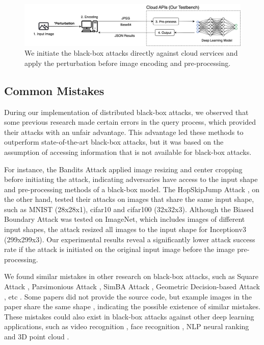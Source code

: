 \begin{figure}[tbp]
    \centering
    \includegraphics[width=\linewidth]{figures/chapter_classification/cloudapi.jpg}
    \caption{We initiate the black-box attacks directly against cloud services and apply the perturbation before image encoding and pre-processing.}
    \label{fig:cloudapi}
\end{figure}

\subsection{Common Mistakes}
\label{common_errors}

During our implementation of distributed black-box attacks, we observed that some previous research made certain errors in the query process, which provided their attacks with an unfair advantage. This advantage led these methods to outperform state-of-the-art black-box attacks, but it was based on the assumption of accessing information that is not available for black-box attacks. 

For instance, the Bandits Attack \cite{ilyas2018black, ilyas2018prior} applied image resizing and center cropping before initiating the attack, indicating adversaries have access to the input shape and pre-processing methods of a black-box model. The HopSkipJump Attack \cite{chen2020hopskipjumpattack}, on the other hand, tested their attacks on images that share the same input shape, such as MNIST (28x28x1), cifar10 and cifar100 (32x32x3). Although the Biased Boundary Attack \cite{Brunner_2019} was tested on ImageNet, which includes images of different input shapes, the attack resized all images to the input shape for Inceptionv3 (299x299x3). Our experimental results reveal a significantly lower attack success rate if the attack is initiated on the original input image before the image pre-processing.

We found similar mistakes in other research on black-box attacks, such as Square Attack \cite{andriushchenko2020square}, Parsimonious Attack \cite{moon2019parsimonious}, SimBA Attack \cite{guo2019simple}, Geometric Decision-based Attack \cite{rahmati2020geoda}, etc \cite{cheng2018query, cheng2019sign, chen2020rays, debenedetti2023evading}. Some papers did not provide the source code, but example images in the paper share the same shape \cite{chen2023query, bai2023query, xu2023sparse, wu2023black}, indicating the possible existence of similar mistakes. These mistakes could also exist in black-box attacks against other deep learning applications, such as video recognition \cite{jiang2019black, chen2023coreset, mu2024enhancing}, face recognition \cite{dong2019efficient, ma2023transferable}, NLP neural ranking \cite{wu2023prada, liu2022order} and 3D point cloud \cite{liu2022imperceptible, zhang20233d, tao20233dhacker}.

